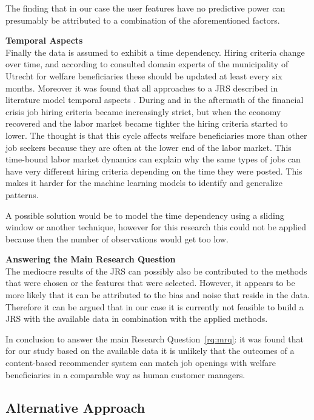 The finding that in our case the user features have no predictive power can presumably be attributed to a combination of the aforementioned factors. 

\noindent
\textbf{Temporal Aspects} \\
Finally the data is assumed to exhibit a time dependency.
Hiring criteria change over time, and according to consulted domain experts of the municipality of Utrecht for welfare beneficiaries these should be updated at least every six months. 
Moreover it was found that all approaches to a JRS described in literature model temporal aspects  \cite{kenthapadi2017personalized, T.Al-Otaibi2012ASystems, Zheng2012JobSurvey, hong2013job}.
During and in the aftermath of the financial crisis job hiring criteria became increasingly strict, but when the economy recovered and the labor market became tighter the hiring criteria started to lower. 
The thought is that this cycle affects welfare beneficiaries more than other job seekers because they are often at the lower end of the labor market.
This time-bound labor market dynamics can explain why the same types of jobs can have very different hiring criteria depending on the time they were posted.
This makes it harder for the machine learning models to identify and generalize patterns.

A possible solution would be to model the time dependency using a sliding window or another technique, however for this research this could not be applied because then the number of observations would get too low.

\noindent
\textbf{Answering the Main Research Question}\\
The mediocre results of the JRS can possibly also be contributed to the methods that were chosen or the features that were selected. 
However, it appears to be more likely that it can be attributed to the bias and noise that reside in the data.
Therefore it can be argued that in our case it is currently not feasible to build a JRS with the available data in combination with the applied methods. 

In conclusion to answer the main Research Question~\ref{rq:mrq}: it was found that for our study based on the available data it is unlikely that the outcomes of a content-based recommender system can match job openings with welfare beneficiaries in a comparable way as human customer managers. 

\subsection{Alternative Approach}
\label{ssec:learnings}

